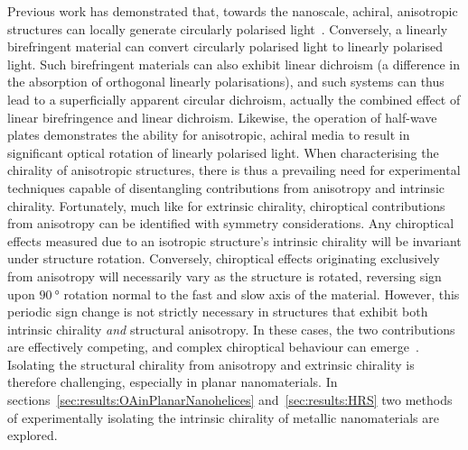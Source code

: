 Previous work has demonstrated that, towards the nanoscale, achiral, anisotropic structures can locally generate circularly polarised light~\cite{Hashiyada2018}. Conversely, a linearly birefringent material can convert circularly polarised light to linearly polarised light. Such birefringent materials can also exhibit linear dichroism (a difference in the absorption of orthogonal linearly polarisations), and such systems can thus lead to a superficially apparent circular dichroism, actually the combined effect of linear birefringence and linear dichroism. Likewise, the operation of half-wave plates demonstrates the ability for anisotropic, achiral media to result in significant optical rotation of linearly polarised light. When characterising the chirality of anisotropic structures, there is thus a prevailing need for experimental techniques capable of disentangling contributions from anisotropy and intrinsic chirality. Fortunately, much like for extrinsic chirality, chiroptical contributions from anisotropy can be identified with symmetry considerations. Any chiroptical effects measured due to an isotropic structure's intrinsic chirality will be invariant under structure rotation. Conversely, chiroptical effects originating exclusively from anisotropy will necessarily vary as the structure is rotated, reversing sign upon $\SI{90}{\degree}$ rotation normal to the fast and slow axis of the material. However, this periodic sign change is not strictly necessary in structures that exhibit both intrinsic chirality \textit{and} structural anisotropy. In these cases, the two contributions are effectively competing, and complex chiroptical behaviour can emerge~\cite{Hooper2017}. Isolating the structural chirality from anisotropy and extrinsic chirality is therefore challenging, especially in planar nanomaterials. In sections~\ref{sec:results:OAinPlanarNanohelices} and~\ref{sec:results:HRS} two methods of experimentally isolating the intrinsic chirality of metallic nanomaterials are explored.


